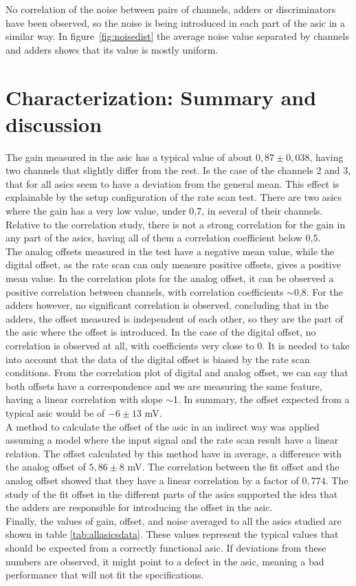\documentclass[main.tex]{subfiles}
\begin{document}
No correlation of the noise between pairs of channels, adders or discriminators have been observed, so the noise is being introduced in each part of the \gls{asic} in a similar way.
In figure~\ref{fig:noisedist} the average noise value separated by channels and adders shows that its value is mostly uniform.

\section{Characterization: Summary and discussion}

The gain measured in the \gls{asic} has a typical value of about $0,87\pm0,038$, having two channels that slightly differ from the rest. Is the case of the channels 2 and 3, that for all \glspl{asic} seem to have a deviation from the general mean. This effect is explainable by the setup configuration of the rate scan test. There are two \glspl{asic} where the gain has a very low value, under 0,7, in several of their channels. Relative to the correlation study, there is not a strong correlation for the gain in any part of the \glspl{asic}, having all of them a correlation coefficient below 0,5.\\
The analog offsets measured in the test have a negative mean value, while the digital offset, as the rate scan can only measure positive offsets, gives a positive mean value. In the correlation plots for the analog offset, it can be observed a positive correlation between channels, with correlation coefficients $\sim$0,8. For the adders however, no significant correlation is observed, concluding that in the adders, the offset measured is independent of each other, so they are the part of the \gls{asic} where the offset is introduced.
In the case of the digital offset, no correlation is observed at all, with coefficients very close to 0. It is needed to take into account that the data of the digital offset is biased by the rate scan conditions.
From the correlation plot of digital and analog offset, we can say that both offsets have a correspondence and we are measuring the same feature, having a linear correlation with slope $\sim$1.
In summary, the offset expected from a typical \gls{asic} would be of $-6 \pm 13$ mV.\\
A method to calculate the offset of the \gls{asic} in an indirect way was applied assuming a model where the input signal and the rate scan result have a linear relation. The offset calculated by this method have in average, a difference with the analog offset of $5,86 \pm 8$ mV.
The correlation between the fit offset and the analog offset showed that they have a linear correlation by a factor of $0,774$.
The study of the fit offset in the different parts of the \glspl{asic} supported the idea that the adders are responsible for introducing the offset in the \gls{asic}.\\
Finally, the values of gain, offset, and noise averaged to all the \glspl{asic} studied are shown in table \ref{tab:allasicsdata}. These values represent the typical values that should be expected from a correctly functional \gls{asic}. If deviations from these numbers are observed, it might point to a defect in the \gls{asic}, meaning a bad performance that will not fit the specifications.
\end{document}
